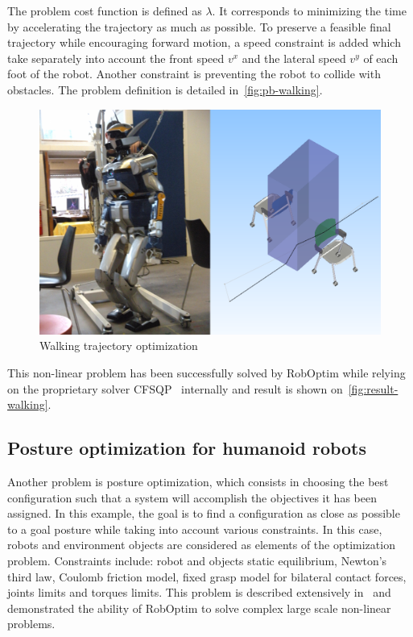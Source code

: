 \documentclass[conference,final,a4paper,twocolumn,9pt]{IEEEtran}
\begin{document}
The problem cost function is defined as $\lambda$. It corresponds to
minimizing the time by accelerating the trajectory as much as
possible. To preserve a feasible final trajectory while encouraging
forward motion, a speed constraint is added which take separately into
account the front speed $v^x$ and the lateral speed $v^y$ of each foot
of the robot. Another constraint is preventing the robot to
collide with obstacles. The problem definition is detailed
in~\autoref{fig:pb-walking}.


\begin{figure}[ht!]
  \begin{center}
    \includegraphics[width=\linewidth]{hrp2-two-chairs.png}
    \caption{Walking trajectory optimization\label{fig:result-walking}}
  \end{center}
\end{figure}


This non-linear problem has been successfully solved by RobOptim while
relying on the proprietary solver CFSQP~\cite{cfsqp} internally and
result is shown on~\autoref{fig:result-walking}.


\subsection{Posture optimization for humanoid robots}


Another problem is posture optimization, which consists in choosing
the best configuration such that a system will accomplish the
objectives it has been assigned. In this example, the goal is to find
a configuration as close as possible to a goal posture while taking
into account various constraints. In this case, robots and environment
objects are considered as elements of the optimization
problem. Constraints include: robot and objects static equilibrium,
Newton's third law, Coulomb friction model, fixed grasp model for
bilateral contact forces, joints limits and torques limits. This
problem is described extensively
in~\cite{Bouyarmane2011a,Bouyarmane2010} and demonstrated the ability
of RobOptim to solve complex large scale non-linear problems.
\end{document}
